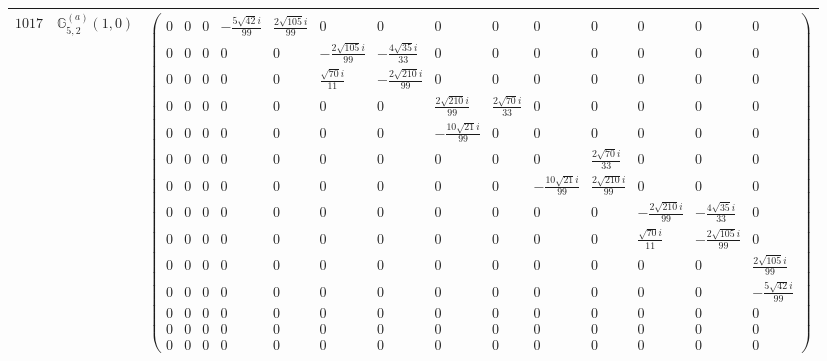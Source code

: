 \documentclass[fleqn,8pt,landscape]{jsarticle}
\begin{document}
\begin{center}
\begin{longtable}{ccc}
$ 1017 $ & $ \mathbb{G}_{5,2}^{(a)}(1,0) $ & $ \begin{pmatrix} 0 & 0 & 0 & - \frac{5 \sqrt{42} i}{99} & \frac{2 \sqrt{105} i}{99} & 0 & 0 & 0 & 0 & 0 & 0 & 0 & 0 & 0 \\ 0 & 0 & 0 & 0 & 0 & - \frac{2 \sqrt{105} i}{99} & - \frac{4 \sqrt{35} i}{33} & 0 & 0 & 0 & 0 & 0 & 0 & 0 \\ 0 & 0 & 0 & 0 & 0 & \frac{\sqrt{70} i}{11} & - \frac{2 \sqrt{210} i}{99} & 0 & 0 & 0 & 0 & 0 & 0 & 0 \\ 0 & 0 & 0 & 0 & 0 & 0 & 0 & \frac{2 \sqrt{210} i}{99} & \frac{2 \sqrt{70} i}{33} & 0 & 0 & 0 & 0 & 0 \\ 0 & 0 & 0 & 0 & 0 & 0 & 0 & - \frac{10 \sqrt{21} i}{99} & 0 & 0 & 0 & 0 & 0 & 0 \\ 0 & 0 & 0 & 0 & 0 & 0 & 0 & 0 & 0 & 0 & \frac{2 \sqrt{70} i}{33} & 0 & 0 & 0 \\ 0 & 0 & 0 & 0 & 0 & 0 & 0 & 0 & 0 & - \frac{10 \sqrt{21} i}{99} & \frac{2 \sqrt{210} i}{99} & 0 & 0 & 0 \\ 0 & 0 & 0 & 0 & 0 & 0 & 0 & 0 & 0 & 0 & 0 & - \frac{2 \sqrt{210} i}{99} & - \frac{4 \sqrt{35} i}{33} & 0 \\ 0 & 0 & 0 & 0 & 0 & 0 & 0 & 0 & 0 & 0 & 0 & \frac{\sqrt{70} i}{11} & - \frac{2 \sqrt{105} i}{99} & 0 \\ 0 & 0 & 0 & 0 & 0 & 0 & 0 & 0 & 0 & 0 & 0 & 0 & 0 & \frac{2 \sqrt{105} i}{99} \\ 0 & 0 & 0 & 0 & 0 & 0 & 0 & 0 & 0 & 0 & 0 & 0 & 0 & - \frac{5 \sqrt{42} i}{99} \\ 0 & 0 & 0 & 0 & 0 & 0 & 0 & 0 & 0 & 0 & 0 & 0 & 0 & 0 \\ 0 & 0 & 0 & 0 & 0 & 0 & 0 & 0 & 0 & 0 & 0 & 0 & 0 & 0 \\ 0 & 0 & 0 & 0 & 0 & 0 & 0 & 0 & 0 & 0 & 0 & 0 & 0 & 0 \end{pmatrix} $ \\ \hline

\end{longtable}
\end{center}
\end{document}
